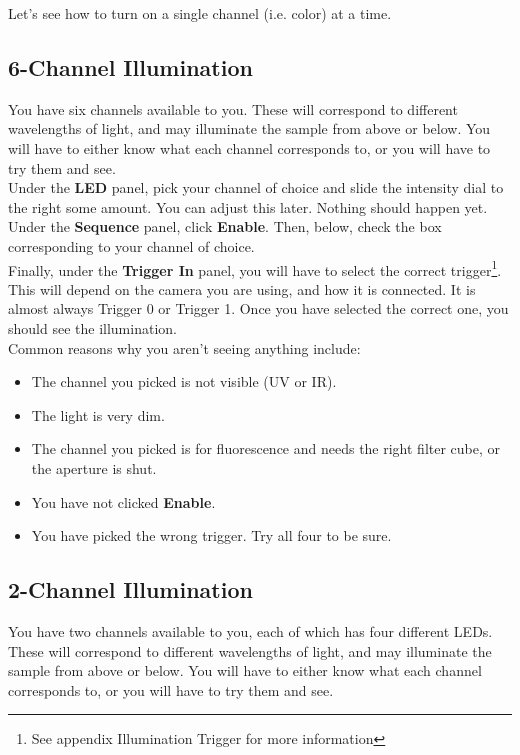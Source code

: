 \documentclass{report}
\begin{document}
Let's see  how to turn on a single channel (i.e. color) at a time.


\subsection{6-Channel Illumination}

You have six channels available to you. These will correspond to different wavelengths of light, and may illuminate the sample from above or below. You will have to either know what each channel corresponds to, or you will have to try them and see.\\

Under the \textbf{LED} panel, pick your channel of choice and slide the intensity dial to the right some amount. You can adjust this later. Nothing should happen yet.\\

Under the \textbf{Sequence} panel, click \textbf{Enable}. Then, below, check the box corresponding to your channel of choice.\\

Finally, under the \textbf{Trigger In} panel, you will have to select the correct trigger\footnote{See appendix Illumination Trigger for more information}. This will depend on the camera you are using, and how it is connected. It is almost always Trigger 0 or Trigger 1. Once you have selected the correct one, you should see the illumination.\\

Common reasons why you aren't seeing anything include:
\begin{itemize}
	\item The channel you picked is not visible (UV or IR).
	\item The light is very dim.
	\item The channel you picked is for fluorescence and needs the right filter cube, or the aperture is shut.
	\item You have not clicked \textbf{Enable}.
	\item You have picked the wrong trigger. Try all four to be sure.
\end{itemize}


\subsection{2-Channel Illumination}

You have two channels available to you, each of which has four different LEDs. These will correspond to different wavelengths of light, and may illuminate the sample from above or below. You will have to either know what each channel corresponds to, or you will have to try them and see.\\
\end{document}
